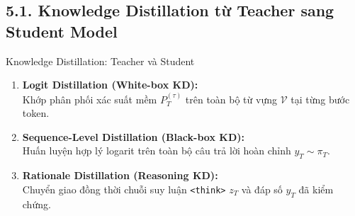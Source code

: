 
\subsection{5.1. Knowledge Distillation từ Teacher sang Student Model}

\begin{frame}{Knowledge Distillation: Teacher và Student}
  \small
  \begin{enumerate}\setlength{\itemsep}{6pt}
    \item \textbf{Logit Distillation (White-box KD):}\\
      Khớp phân phối xác suất mềm $P_T^{(\tau)}$ trên toàn bộ từ vựng $\mathcal{V}$ tại từng bước token.
    \item \textbf{Sequence-Level Distillation (Black-box KD):}\\
      Huấn luyện hợp lý logarit trên toàn bộ câu trả lời hoàn chỉnh $y_T \sim \pi_T$.
    \item \textbf{Rationale Distillation (Reasoning KD):}\\
      Chuyển giao đồng thời chuỗi suy luận \texttt{<think>} $z_T$ và đáp số $y_T$ đã kiểm chứng.
  \end{enumerate}
  \par\vspace{0pt}
\end{frame}

